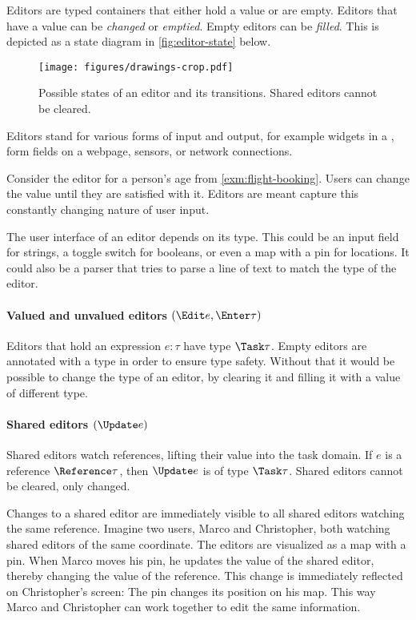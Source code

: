 Editors are typed containers that either hold a value or are empty.
Editors that have a value can be \emph{changed} or \emph{emptied}.
Empty editors can be \emph{filled}.
This is depicted as a state diagram in \autoref{fig:editor-state} below.

\begin{figure}[h]
  \centering
  \texttt{[image: figures/drawings-crop.pdf]}
  \caption{
    Possible states of an editor and its transitions.
    Shared editors cannot be cleared.
  }
  \label{fig:editor-state}
\end{figure}

Editors stand for various forms of input and output, for example widgets in a \GUI, form fields on a webpage, sensors, or network connections.

Consider the editor for a person's age from \autoref{exm:flight-booking}.
Users can change the value until they are satisfied with it.
Editors are meant capture this constantly changing nature of user input.

The user interface of an editor depends on its type.
This could be an input field for strings, a toggle switch for booleans, or even a map with a pin for locations.
It could also be a parser that tries to parse a line of text to match the type of the editor.


\paragraph{Valued and unvalued editors $(\Edit e, \Enter \tau)$}

Editors that hold an expression $e : \tau$ have type $\Task \tau$.
Empty editors are annotated with a type in order to ensure type safety.
Without that it would be possible to change the type of an editor, by clearing it and filling it with a value of different type.

\paragraph{Shared editors $(\Update e)$}

Shared editors watch references, lifting their value into the task domain.
If $e$ is a reference $\Reference \tau$, then $\Update e$ is of type $\Task \tau$.
Shared editors cannot be cleared, only changed.

Changes to a shared editor are immediately visible to all shared editors watching the same reference.
Imagine two users, Marco and Christopher, both watching shared editors of the same coordinate.
The editors are visualized as a map with a pin.
When Marco moves his pin, he updates the value of the shared editor, thereby changing the value of the reference.
This change is immediately reflected on Christopher's screen: The pin changes its position on his map.
This way Marco and Christopher can work together to edit the same information.

